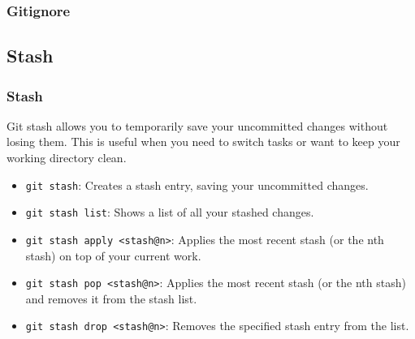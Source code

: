 \documentclass{beamer}
\begin{document}
    \begin{frame}
        \frametitle{Gitignore}
        \begin{figure}[H]
            \centering
            \noindent
        \end{figure}
    \end{frame}

    \subsection{Stash}\label{subsec:stash}
    \begin{frame}
        \frametitle{Stash}
        Git stash allows you to temporarily save your uncommitted changes without losing them. This is useful when you need to switch tasks or want to keep your working directory clean.
    \end{frame}

    \begin{frame}
        \begin{itemize}
            \item \texttt{git stash}: Creates a stash entry, saving your uncommitted changes.
            \item \texttt{git stash list}: Shows a list of all your stashed changes.
            \item \texttt{git stash apply <stash@{n}>}: Applies the most recent stash (or the nth stash) on top of your current work.
            \item \texttt{git stash pop <stash@{n}>}: Applies the most recent stash (or the nth stash) and removes it from the stash list.
            \item \texttt{git stash drop <stash@{n}>}: Removes the specified stash entry from the list.
        \end{itemize}
    \end{frame}
\end{document}
